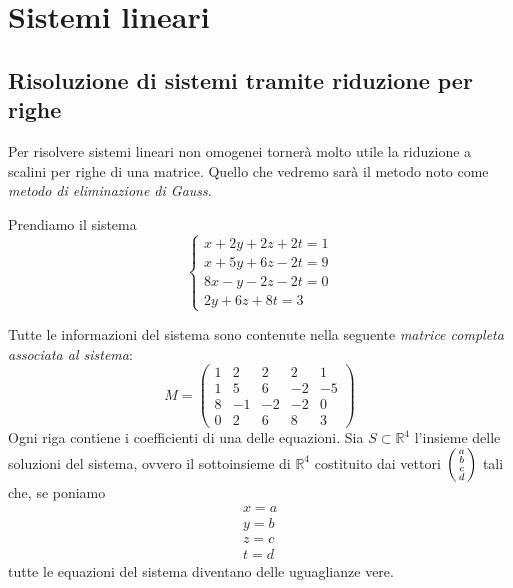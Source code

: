 
\section{Sistemi lineari}

\subsection{Risoluzione di sistemi tramite riduzione per righe}
Per risolvere sistemi lineari non omogenei torner\`a molto utile la riduzione
a scalini per righe di una matrice. Quello che vedremo sar\`a il metodo noto come
\emph{metodo di	eliminazione di Gauss}.

\begin{example}
	Prendiamo il sistema
	\begin{equation*}
		\begin{cases}
			x + 2y + 2z + 2t = 1 \\
			x +5y + 6z -2t = 9   \\
			8x - y -2z -2t = 0   \\
			2y + 6z + 8t = 3
		\end{cases}
	\end{equation*}
	
	Tutte le informazioni del sistema sono contenute nella seguente
	\emph{matrice completa associata al sistema}:
	\begin{equation*}
		M = \begin{pmatrix}
			1 & 2  & 2  & 2  & 1  \\
			1 & 5  & 6  & -2 & -5 \\
			8 & -1 & -2 & -2 & 0  \\
			0 & 2  & 6  & 8  & 3
		\end{pmatrix}
	\end{equation*}
	Ogni riga contiene i coefficienti di una delle equazioni.
	Sia $S \subset \mathbb{R}^4$ l'insieme delle soluzioni del sistema, ovvero
	il sottoinsieme di $\mathbb{R}^4$ costituito dai vettori
	$\begin{psmallmatrix} a \\ b \\ c \\ d \end{psmallmatrix}$ tali che, se poniamo
	\begin{gather*}
		x = a \\
		y = b \\
		z = c \\
		t = d
	\end{gather*}
	tutte le equazioni del sistema diventano delle uguaglianze vere.
\end{example}


